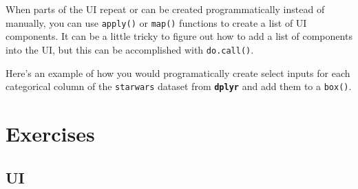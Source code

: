 \documentclass[
  oneside]{book}
\newenvironment{Shaded}{\begin{snugshade}}{\end{snugshade}}
\newcommand{\AttributeTok}[1]{\textcolor[rgb]{0.77,0.63,0.00}{#1}}
\newcommand{\CommentTok}[1]{\textcolor[rgb]{0.56,0.35,0.01}{\textit{#1}}}
\newcommand{\ConstantTok}[1]{\textcolor[rgb]{0.00,0.00,0.00}{#1}}
\newcommand{\ControlFlowTok}[1]{\textcolor[rgb]{0.13,0.29,0.53}{\textbf{#1}}}
\newcommand{\DecValTok}[1]{\textcolor[rgb]{0.00,0.00,0.81}{#1}}
\newcommand{\FunctionTok}[1]{\textcolor[rgb]{0.00,0.00,0.00}{#1}}
\newcommand{\NormalTok}[1]{#1}
\newcommand{\OtherTok}[1]{\textcolor[rgb]{0.56,0.35,0.01}{#1}}
\newcommand{\SpecialCharTok}[1]{\textcolor[rgb]{0.00,0.00,0.00}{#1}}
\newcommand{\StringTok}[1]{\textcolor[rgb]{0.31,0.60,0.02}{#1}}
\begin{document}
When parts of the UI repeat or can be created programmatically instead of manually, you can use \texttt{apply}\texttt{()} or \texttt{map}\texttt{()} functions to create a list of UI components. It can be a little tricky to figure out how to add a list of components into the UI, but this can be accomplished with \texttt{do.call}\texttt{()}.

Here's an example of how you would programatically create select inputs for each categorical column of the \texttt{starwars} dataset from \textbf{\texttt{dplyr}} and add them to a \texttt{box}\texttt{()}.

\begin{Shaded}
\end{Shaded}

\hypertarget{exercises-structure}{%
\section{Exercises}\label{exercises-structure}}

\hypertarget{ui-1}{%
\subsection{UI}\label{ui-1}}
\end{document}
